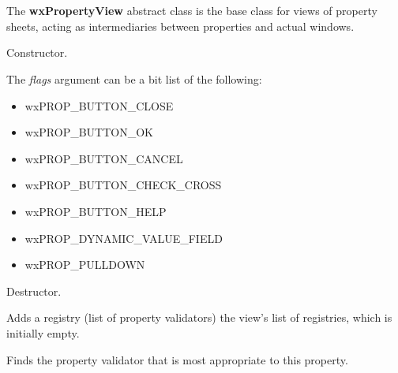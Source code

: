 \section{}\label{wxpropertyview}


The {\bf wxPropertyView} abstract class is the base class for views
of property sheets, acting as intermediaries between properties and
actual windows.



Constructor.

The {\it flags} argument can be a bit list of the following:

\begin{itemize}\itemsep=0pt
\item wxPROP\_BUTTON\_CLOSE
\item wxPROP\_BUTTON\_OK
\item wxPROP\_BUTTON\_CANCEL
\item wxPROP\_BUTTON\_CHECK\_CROSS
\item wxPROP\_BUTTON\_HELP
\item wxPROP\_DYNAMIC\_VALUE\_FIELD
\item wxPROP\_PULLDOWN
\end{itemize}



Destructor.

\label{wxpropertyviewaddregistry}


Adds a registry (list of property validators) the view's list of registries, which is initially empty.

\label{wxpropertyviewfindpropertyvalidator}


Finds the property validator that is most appropriate to this property.

\label{wxpropertyviewgetpropertysheet}

